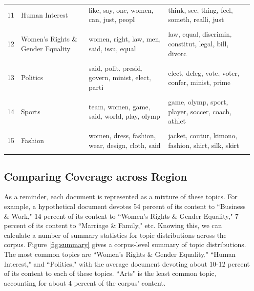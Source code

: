 \documentclass[11pt, oneside]{article}
\begin{document}
\begin{table}[!p]
\begin{tabular}{p{.3cm} M{4cm} | M{5cm} | M{5 cm} }
  11 & Human Interest & like, say, one, women, can, just, peopl & think, see, thing, feel, someth, realli, just \\ &&&\\
  12 & Women's Rights \& Gender Equality & women, right, law, men, said, issu, equal & law, equal, discrimin, constitut, legal, bill, divorc \\ &&&\\
  13 & Politics & said, polit, presid, govern, minist, elect, parti & elect, deleg, vote, voter, confer, minist, prime \\ &&&\\
  14 & Sports & team, women, game, said, world, play, olymp & game, olymp, sport, player, soccer, coach, athlet \\ &&&\\
  15 & Fashion & women, dress, fashion, wear, design, cloth, said & jacket, coutur, kimono, fashion, shirt, silk, skirt \\ &&&\\
   \hline
\end{tabular}
\end{table}

\subsection{Comparing Coverage across Region}

As a reminder, each document is represented as a mixture of these topics. For example, a hypothetical document devotes 54 percent of its content to ``Business \& Work," 14 percent of its content to ``Women's Rights \& Gender Equality," 7 percent of its content to ``Marriage \& Family," etc. Knowing this, we can calculate a number of summary statistics for topic distributions across the corpus. Figure \ref{fig:summary} gives a corpus-level summary of topic distributions. The most common topics are ``Women's Rights \& Gender Equality," ``Human Interest," and ``Politics," with the average document devoting about 10-12 percent of its content to each of these topics. ``Arts" is the least common topic, accounting for about 4 percent of the corpus' content.
\end{document}
